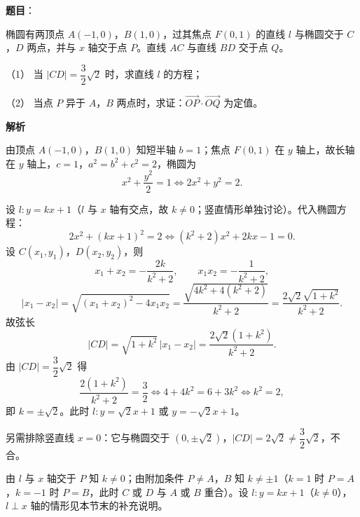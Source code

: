 \begin{answer}

\textbf{题目}：

椭圆有两顶点 $A(-1,0)$，$B(1,0)$，过其焦点 $F(0,1)$ 的直线 $l$ 与椭圆交于 $C$，$D$ 两点，并与 $x$ 轴交于点 $P$。直线 $AC$ 与直线 $BD$ 交于点 $Q$。

（1） 当 $|CD|=\dfrac32\sqrt2$ 时，求直线 $l$ 的方程；

（2） 当点 $P$ 异于 $A$，$B$ 两点时，求证：$\overrightarrow{OP}\cdot\overrightarrow{OQ}$ 为定值。
\nopagebreak[4]
\begin{center}\end{center}
\nopagebreak[4]
\textbf{解析}

由顶点 $A(-1,0)$，$B(1,0)$ 知短半轴 $b=1$；焦点 $F(0,1)$ 在 $y$ 轴上，故长轴在 $y$ 轴上，$c=1$，$a^2=b^2+c^2=2$，椭圆为
\nopagebreak[4]
\[x^2+\frac{y^2}{2}=1\iff 2x^2+y^2=2.\]

设 $l\colon y=kx+1$（$l$ 与 $x$ 轴有交点，故 $k\neq0$；竖直情形单独讨论）。代入椭圆方程：
\nopagebreak[4]
\[2x^2+(kx+1)^2=2\iff(k^2+2)x^2+2kx-1=0.\]
设 $C(x_1,y_1)$，$D(x_2,y_2)$，则
\nopagebreak[4]
\[x_1+x_2=-\frac{2k}{k^2+2},\qquad x_1x_2=-\frac{1}{k^2+2},\]
\nopagebreak[4]
\[|x_1-x_2|=\sqrt{(x_1+x_2)^2-4x_1x_2}=\frac{\sqrt{4k^2+4(k^2+2)}}{k^2+2}=\frac{2\sqrt2\sqrt{1+k^2}}{k^2+2}.\]
故弦长
\nopagebreak[4]
\[|CD|=\sqrt{1+k^2}\,|x_1-x_2|=\frac{2\sqrt2(1+k^2)}{k^2+2}.\]
由 $|CD|=\dfrac32\sqrt2$ 得
\nopagebreak[4]
\[\frac{2(1+k^2)}{k^2+2}=\frac32\iff4+4k^2=6+3k^2\iff k^2=2,\]
即 $k=\pm\sqrt2$。此时 $l\colon y=\sqrt2x+1$ 或 $y=-\sqrt2x+1$。

另需排除竖直线 $x=0$：它与椭圆交于 $(0,\pm\sqrt2)$，$|CD|=2\sqrt2\neq\dfrac32\sqrt2$，不合。

由 $l$ 与 $x$ 轴交于 $P$ 知 $k\neq0$；由附加条件 $P\neq A$，$B$ 知 $k\neq\pm1$（$k=1$ 时 $P=A$，$k=-1$ 时 $P=B$，此时 $C$ 或 $D$ 与 $A$ 或 $B$ 重合）。设 $l\colon y=kx+1$（$k\neq0$），$l\perp x$ 轴的情形见本节末的补充说明。


\end{answer}
